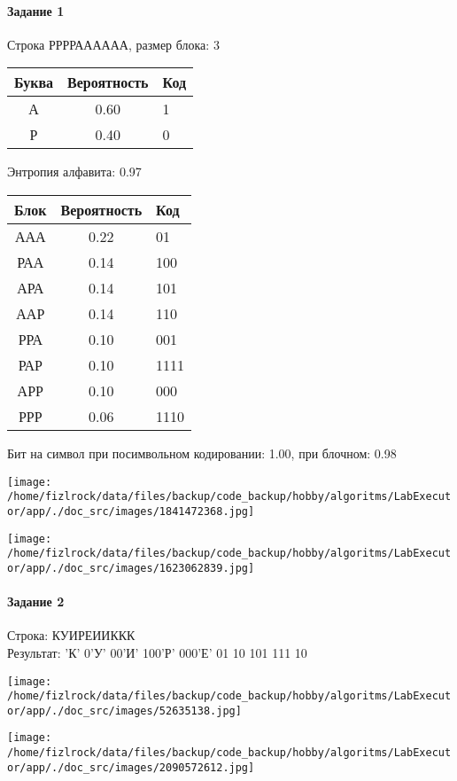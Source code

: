 \documentclass[a4paper, 12pt]{article}
\begin{document}
\paragraph{Задание 1}

Строка РРРРАААААА, размер блока: 3
\begin{center}
 \begin{tabular}{ |c|c|l| } 
  \hline
     Буква & Вероятность & Код\\ \hline
А & 0.60 & 1\\\hline
Р & 0.40 & 0
\\ \hline \end{tabular}
\end{center}
Энтропия алфавита: 0.97
\begin{center}
 \begin{tabular}{ |c|c|l| } 
  \hline
     Блок & Вероятность & Код\\ \hline
ААА & 0.22 & 01\\\hline
РАА & 0.14 & 100\\\hline
АРА & 0.14 & 101\\\hline
ААР & 0.14 & 110\\\hline
РРА & 0.10 & 001\\\hline
РАР & 0.10 & 1111\\\hline
АРР & 0.10 & 000\\\hline
РРР & 0.06 & 1110
\\ \hline \end{tabular}
\end{center}
Бит на символ при посимвольном кодировании: 1.00, при блочном: 0.98

\texttt{[image: /home/fizlrock/data/files/backup/code\_backup/hobby/algoritms/LabExecutor/app/./doc\_src/images/1841472368.jpg]}

\texttt{[image: /home/fizlrock/data/files/backup/code\_backup/hobby/algoritms/LabExecutor/app/./doc\_src/images/1623062839.jpg]}
\pagebreak
\paragraph{Задание 2}

Строка: 
КУИРЕИИККК\\
Результат: 'К' 0'У' 00'И' 100'Р' 000'Е' 01 10 101 111 10

\texttt{[image: /home/fizlrock/data/files/backup/code\_backup/hobby/algoritms/LabExecutor/app/./doc\_src/images/52635138.jpg]}

\texttt{[image: /home/fizlrock/data/files/backup/code\_backup/hobby/algoritms/LabExecutor/app/./doc\_src/images/2090572612.jpg]}
\end{document}
